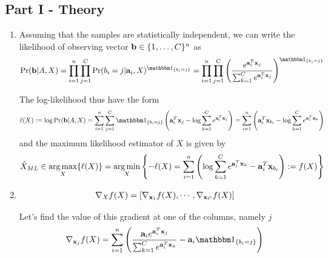 \documentclass{article}
\begin{document}

\subsection*{Part I - Theory}
\begin{enumerate}[label=1.I.\arabic*]
    \item Assuming that the samples are statistically independent, we can write the likelihood of observing vector $\mathbf{b} \in \{1, \dots, C\}^n$ as
    \begin{align}
        \Pr (\bb | A , X) = \prod_{i=1}^{n} \prod_{j=1}^{C} \Pr (b_i = j | \aa_i, X)^{\ind{b_i = j}} = \prod_{i=1}^{n} \prod_{j=1}^{C} \left( \frac{e^{\aa_i^T \xx_j}}{\sum_{k=1}^{C} e^{\aa_i^T \xx_j}} \right)^{\ind{b_i = j}}
    \end{align}
    
    The log-likelihood thus have the form
    \begin{align}
        \ell(X) := \log \Pr (\bb | A , X) = \sum_{i=1}^{n} \sum_{j=1}^{C} \ind{b_i = j} \left( \aa_i^T \xx_j - \log \sum_{k=1}^{C} e^{\aa_i^T \xx_j} \right) = \sum_{i=1}^{n} \left( \aa_i^T \xx_{b_i} - \log \sum_{k=1}^{C} e^{\aa_i^T \xx_{k}} \right)
    \end{align}
    and the maximum likelihood estimator of $X$ is given by
    \begin{align}
        \hat{X}_{ML} \in \operatorname*{arg\,max}_X \{ \ell(X) \} = \operatorname*{arg\,min}_X \left\lbrace -\ell(X) = \sum_{i=1}^{n} \left( \log \sum_{k=1}^{C} e^{\mathbf{a}_i^T \mathbf{x}_{k}} - \mathbf{a}_i^T \mathbf{x}_{b_i} \right) := f(X) \right\rbrace
    \end{align}
    
    \item
    \begin{align}
        \nabla_X f(X) = [\nabla_{\mathbf{x}_1} f(X), \cdots, \nabla_{\mathbf{x}_C} f(X)]
    \end{align}
    
    Let's find the value of this gradient at one of the columns, namely $j$
    \begin{align}
        \nabla_{\xx_j} f(X) = \sum_{i=1}^{n} \left( \frac{\aa_i e^{\aa_i^T \xx_{j}} }{ \sum_{k=1}^{C} e^{\aa_i^T \xx_{k}}} - \aa_i \ind{b_i = j}\right)
    \end{align}
    

\end{enumerate}
\end{document}
